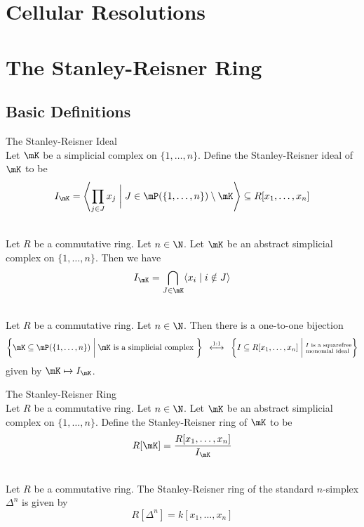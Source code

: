 \documentclass[a4paper]{article}
\begin{document}
\pagebreak
\section{Cellular Resolutions}

\pagebreak
\section{The Stanley-Reisner Ring}
\subsection{Basic Definitions}
\begin{defn}{The Stanley-Reisner Ideal}{}\\
Let $\mK$ be a simplicial complex on $\{1,\dots,n\}$. Define the Stanley-Reisner ideal of $\mK$ to be $$I_\mK=\left\langle\prod_{j\in J}x_j\;\bigg{|}\;J\in\mP(\{1,\dots,n\})\setminus\mK\right\rangle\subseteq R[x_1,\dots,x_n]$$
\end{defn}

\begin{prp}{}{}\\
Let $R$ be a commutative ring. Let $n\in\N$. Let $\mK$ be an abstract simplicial complex on $\{1,\dots,n\}$. Then we have $$I_\mK=\bigcap_{J\in\mK}\langle x_i\;|\;i\notin J\rangle$$
\end{prp}

\begin{prp}{}{}\\
Let $R$ be a commutative ring. Let $n\in\N$. Then there is a one-to-one bijection $$\left\{\mK\subseteq\mP(\{1,\dots,n\})\;\bigg{|}\;\mK\text{ is a simplicial complex }\right\}\;\;\overset{1:1}{\longleftrightarrow}\;\;\left\{I\subseteq R[x_1,\dots,x_n]\;\bigg{|}\;\substack{I\text{ is a squarefree}\\\text{monomial ideal }}\right\}$$ given by $\mK\mapsto I_\mK$. 
\end{prp}

\begin{defn}{The Stanley-Reisner Ring}{}\\
Let $R$ be a commutative ring. Let $n\in\N$. Let $\mK$ be an abstract simplicial complex on $\{1,\dots,n\}$. Define the Stanley-Reisner ring of $\mK$ to be $$R[\mK]=\frac{R[x_1,\dots,x_n]}{I_\mK}$$
\end{defn}

\begin{eg}{}{}\\
Let $R$ be a commutative ring. The Stanley-Reisner ring of the standard $n$-simplex $\Delta^n$ is given by $$R[\Delta^n]=k[x_1,\dots,x_n]$$
\end{eg}
\end{document}
